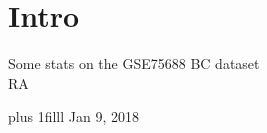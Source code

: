 \documentclass[onepage]{beamer}
\author{\small RA}
\makeatletter
\newcommand{\EMAIL}{{\color{blue}randreev{\tiny\color{white}.\hspace{-1.5pt}}@{\tiny\color{white}.\hspace{-1.5pt}}stat.sinica.edu.tw}}
\def\Bottom#1{\vskip 0pt plus 1filll #1}
\makeatother
\begin{document}

\section{Intro}



\begin{frame}[plain,t]
	\begin{center}
		Some stats on the GSE75688 BC dataset
		\\[1\baselineskip]
		\small
		RA

		\vspace{1cm}


	\end{center}

	\Bottom{
		\scriptsize
		\hfill
		Jan 9, 2018
		\\ {\ }
	}
\end{frame}





\end{document}
